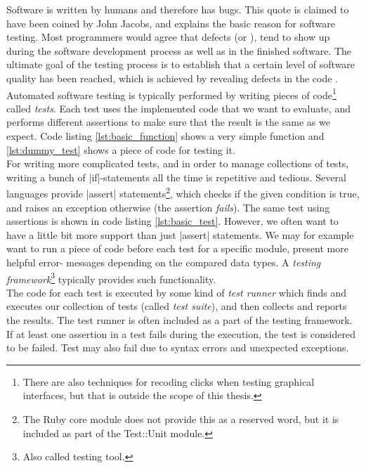 \MakeShortVerb{\|}

Software is written by humans and therefore has bugs. This quote is
claimed to have been coined by John Jacobs\cite{web:quote_jacobs}, and
explains the basic reason for software testing. Most programmers would
agree that defects (or ), tend to show up
during the software development process as well as in the finished
software. The ultimate goal of the testing process is to establish that
a certain level of software quality has been reached, which is achieved
by revealing defects in the code \cite{book:adp}.\\

Automated software testing is typically performed by writing pieces of
code\footnote{There are also techniques for recoding clicks when testing
graphical interfaces, but that is outside the scope of this thesis.}
called \emph{tests}. Each test uses the implemented code that we want to
evaluate, and performs different assertions to make sure that the result
is the same as we expect. Code listing \ref{lst:basic_function} shows a
very simple function and \ref{lst:dummy_test} shows a piece of code for
testing it.\cite{wiki:test_automation}\\

For writing more complicated tests, and in order to manage collections
of tests, writing a bunch of |if|-statements all the time is repetitive
and tedious. Several languages provide |assert| statements\footnote{The
Ruby core module does not provide this as a reserved word, but it is
included as part of the Test::Unit module.}, which checks if the given
condition is true, and raises an exception otherwise (the assertion
\emph{fails}). The same test using assertions is shown in code listing
\ref{lst:basic_test}. However, we often want to have a little bit more
support than just |assert| statements. We may for example want to run a
piece of code before each test for a specific module, present more
helpful error- messages depending on the compared data types. A
\emph{testing framework}\footnote{Also called testing tool.} typically
provides such functionality.\cite{wiki:test_automation}\\

The code for each test is executed by some kind of \emph{test runner}
which finds and executes our collection of tests (called \emph{test
suite}), and then collects and reports the results. The test runner is
often included as a part of the testing framework. If at least one
assertion in a test fails during the execution, the test is considered
to be failed. Test may also fail due to syntax errors and unexpected
exceptions.\\

